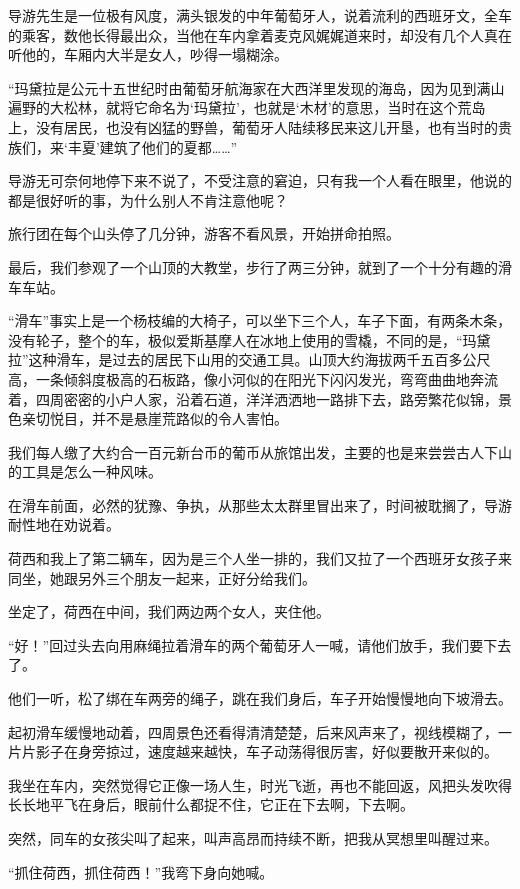 \par 导游先生是一位极有风度，满头银发的中年葡萄牙人，说着流利的西班牙文，全车的乘客，数他长得最出众，当他在车内拿着麦克风娓娓道来时，却没有几个人真在听他的，车厢内大半是女人，吵得一塌糊涂。
\par “玛黛拉是公元十五世纪时由葡萄牙航海家在大西洋里发现的海岛，因为见到满山遍野的大松林，就将它命名为‘玛黛拉’，也就是‘木材’的意思，当时在这个荒岛上，没有居民，也没有凶猛的野兽，葡萄牙人陆续移民来这儿开垦，也有当时的贵族们，来‘丰夏’建筑了他们的夏都……”
\par 导游无可奈何地停下来不说了，不受注意的窘迫，只有我一个人看在眼里，他说的都是很好听的事，为什么别人不肯注意他呢？
\par 旅行团在每个山头停了几分钟，游客不看风景，开始拼命拍照。
\par 最后，我们参观了一个山顶的大教堂，步行了两三分钟，就到了一个十分有趣的滑车车站。
\par “滑车”事实上是一个杨枝编的大椅子，可以坐下三个人，车子下面，有两条木条，没有轮子，整个的车，极似爱斯基摩人在冰地上使用的雪橇，不同的是，“玛黛拉”这种滑车，是过去的居民下山用的交通工具。山顶大约海拔两千五百多公尺高，一条倾斜度极高的石板路，像小河似的在阳光下闪闪发光，弯弯曲曲地奔流着，四周密密的小户人家，沿着石道，洋洋洒洒地一路排下去，路旁繁花似锦，景色亲切悦目，并不是悬崖荒路似的令人害怕。
\par 我们每人缴了大约合一百元新台币的葡币从旅馆出发，主要的也是来尝尝古人下山的工具是怎么一种风味。
\par 在滑车前面，必然的犹豫、争执，从那些太太群里冒出来了，时间被耽搁了，导游耐性地在劝说着。
\par 荷西和我上了第二辆车，因为是三个人坐一排的，我们又拉了一个西班牙女孩子来同坐，她跟另外三个朋友一起来，正好分给我们。
\par 坐定了，荷西在中间，我们两边两个女人，夹住他。
\par “好！”回过头去向用麻绳拉着滑车的两个葡萄牙人一喊，请他们放手，我们要下去了。
\par 他们一听，松了绑在车两旁的绳子，跳在我们身后，车子开始慢慢地向下坡滑去。
\par 起初滑车缓慢地动着，四周景色还看得清清楚楚，后来风声来了，视线模糊了，一片片影子在身旁掠过，速度越来越快，车子动荡得很厉害，好似要散开来似的。
\par 我坐在车内，突然觉得它正像一场人生，时光飞逝，再也不能回返，风把头发吹得长长地平飞在身后，眼前什么都捉不住，它正在下去啊，下去啊。
\par 突然，同车的女孩尖叫了起来，叫声高昂而持续不断，把我从冥想里叫醒过来。
\par “抓住荷西，抓住荷西！”我弯下身向她喊。

